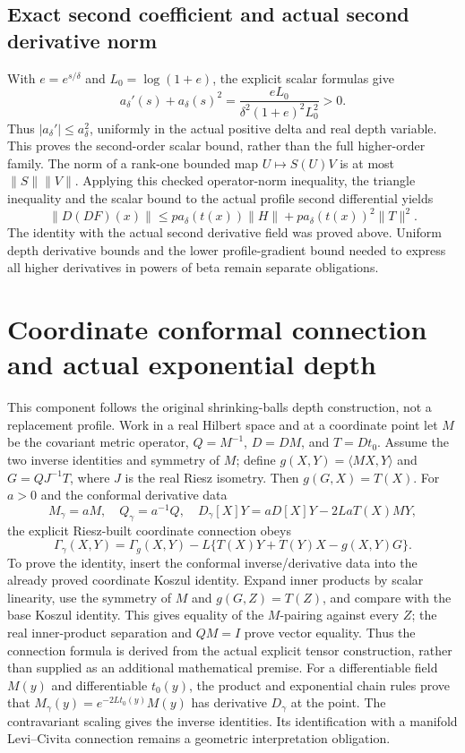 \documentclass[11pt]{article}
\theoremstyle{definition}
\theoremstyle{remark}
\numberwithin{equation}{section}
\begin{document}
\subsection{Exact second coefficient and actual second derivative norm}
\label{profile-chain:second-bound}
With $e=e^{s/\delta}$ and $L_0=\log(1+e)$, the explicit scalar formulas give
\[
 a_\delta'(s)+a_\delta(s)^2
 =\frac{eL_0}{\delta^2(1+e)^2L_0^2}>0.
\]
Thus $|a_\delta'|\le a_\delta^2$, uniformly in the actual positive delta and real depth variable. This proves the second-order scalar bound, rather than the full higher-order family.
The norm of a rank-one bounded map $U\mapsto S(U)V$ is at most $\|S\|\|V\|$. Applying this checked operator-norm inequality, the triangle inequality and the scalar bound to the actual profile second differential yields
\[
 \|D(DF)(x)\|\le p a_\delta(t(x))\|H\|
       +p a_\delta(t(x))^2\|T\|^2.
\]
The identity with the actual second derivative field was proved above. Uniform depth derivative bounds and the lower profile-gradient bound needed to express all higher derivatives in powers of beta remain separate obligations.

\clearpage
\section{Coordinate conformal connection and actual exponential depth}
\label{conformal-depth:connection}\label{conformal-depth:primitive}\label{conformal-depth:chain}\label{conformal-depth:concavity}
This component follows the original shrinking-balls depth construction, not a replacement profile. Work in a real Hilbert space and at a coordinate point let $M$ be the covariant metric operator, $Q=M^{-1}$, $D=DM$, and $T=Dt_0$. Assume the two inverse identities and symmetry of $M$; define $g(X,Y)=\langle MX,Y\rangle$ and $G=QJ^{-1}T$, where $J$ is the real Riesz isometry. Then $g(G,X)=T(X)$.
For $a>0$ and the conformal derivative data
\[
 M_\gamma=aM,\quad Q_\gamma=a^{-1}Q,\quad
 D_\gamma[X]Y=aD[X]Y-2LaT(X)MY,
\]
the explicit Riesz-built coordinate connection obeys
\[
 \Gamma_\gamma(X,Y)=\Gamma_g(X,Y)
 -L\{T(X)Y+T(Y)X-g(X,Y)G\}.
\]
To prove the identity, insert the conformal inverse/derivative data into the already proved coordinate Koszul identity. Expand inner products by scalar linearity, use the symmetry of $M$ and $g(G,Z)=T(Z)$, and compare with the base Koszul identity. This gives equality of the $M$-pairing against every $Z$; the real inner-product separation and $QM=I$ prove vector equality. Thus the connection formula is derived from the actual explicit tensor construction, rather than supplied as an additional mathematical premise.
For a differentiable field $M(y)$ and differentiable $t_0(y)$, the product and exponential chain rules prove that $M_\gamma(y)=e^{-2Lt_0(y)}M(y)$ has derivative $D_\gamma$ at the point. The contravariant scaling gives the inverse identities. Its identification with a manifold Levi--Civita connection remains a geometric interpretation obligation.
\end{document}
